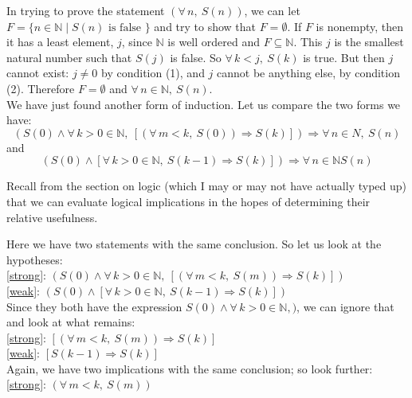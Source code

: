 \documentclass[12pt]{report}
\newcommand{\fall}{\forall\,}
\newcommand{\naturals}{\mathbb{N}}
\begin{document}
In trying to prove the statement $(\fall n,\ S(n))$,
we can let $F = \{n \in \naturals \mid
S(n) \textrm{ is false }\}$ and try to show that $F = \emptyset$. If $F$ is
nonempty, then it has a least element, $j$, since $\naturals$ is 
well ordered and $F \subseteq \naturals$. This $j$ is the smallest natural
number such that $S(j)$ is false. So $\fall k < j,\ S(k)$ is true. But then
$j$ cannot exist: $j \neq 0$ by condition (1), and $j$ cannot be anything
else, by condition (2). Therefore $F = \emptyset$ and 
$\fall n \in \naturals,\ S(n)$.\\

We have just found another form of induction. Let us compare the two forms we
have:
\begin{equation}
(S(0) \land \fall k > 0 \in \naturals,\ [(\fall m < k,\ S(0))
\Rightarrow S(k)]) \Rightarrow \fall n \in N,\ S(n) \label{strong}
\end{equation}
and
\begin{equation}
(S(0) \land [\fall k > 0 \in \naturals,\ S(k-1) \Rightarrow S(k)]) \Rightarrow
\fall n \in \naturals S(n) \label{weak}
\end{equation}

Recall from the section on logic (which I may or may not have 
actually typed up) that we can evaluate logical implications in the hopes of
determining their relative usefulness. 

Here we have two statements with the same conclusion. So let us look at the
hypotheses:\\

\ref{strong}: 
$(S(0) \land \fall k > 0 \in \naturals,
\ [(\fall m < k,\ S(m)) \Rightarrow S(k)])$
\\

\ref{weak}: 
$(S(0) \land [\fall k > 0 \in \naturals,\ S(k-1) \Rightarrow S(k)])$\\

Since they both have the expression $S(0) \land \fall k > 0 \in \naturals,)$,
we can ignore that and look at what remains:\\

\ref{strong}: $[(\fall m < k,\ S(m)) \Rightarrow S(k)]$\\

\ref{weak}: $[S(k-1) \Rightarrow S(k)]$\\

Again, we have two implications with the same conclusion; so look further:\\

\ref{strong}: $(\fall m < k,\ S(m))$\\
\end{document}
